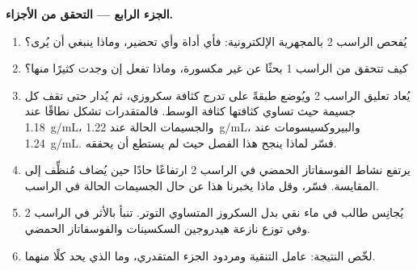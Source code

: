 \begin{problem}
\medskip
\noindent\textbf{الجزء الرابع --- التحقق من الأجزاء.}
\begin{enumerate}[resume]
  \item يُفحص الراسب 2 بالمجهرية الإلكترونية: فأي أداة وأي تحضير،
        وماذا ينبغي أن يُرى؟
  \item كيف تتحقق من الراسب 1 بحثًا عن  غير مكسورة، وماذا تفعل
        إن وجدت كثيرًا منها؟
  \item يُعاد تعليق الراسب 2 ويُوضع طبقةً على تدرج كثافة سكروزي، ثم
        يُدار حتى تقف كل جسيمة حيث تساوي كثافتها كثافة الوسط.
        فالمتقدرات تشكل نطاقًا عند \qty{1.18}{g/mL}، والجسيمات الحالة
        عند \qty{1.22}{g/mL}، والبيروكسيسومات عند \qty{1.24}{g/mL}.
        فسّر لماذا ينجح هذا الفصل حيث لم يستطع  أن يحققه.
  \item يرتفع نشاط الفوسفاتاز الحمضي في الراسب 2 ارتفاعًا حادًا حين
        يُضاف مُنظِّف إلى المقايسة. فسّر، وقل ماذا يخبرنا هذا عن حال
        الجسيمات الحالة في الراسب.
  \item يُجانِس طالب في ماء نقي بدل السكروز المتساوي التوتر. تنبأ
        بالأثر في الراسب 2 وفي توزع نازعة هيدروجين السكسينات
        والفوسفاتاز الحمضي.
  \item لخّص النتيجة: عامل التنقية ومردود الجزء المتقدري، وما الذي
        يحد كلًا منهما.
\end{enumerate}
\end{problem}
